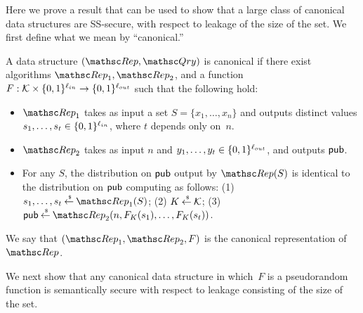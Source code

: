 
Here we prove a result that can be used to show that a large class of canonical
data structures are SS-secure, with respect to leakage of the size of the set.
We first define what we mean by ``canonical.''


\begin{definition}
A data structure $(\Rep, \Qry)$ is {\sf canonical} if
there exist algorithms $\Rep_1, \Rep_2$, and a function
$F: {\cal K} \times \{0,1\}^{\ell_{in}} \rightarrow \{0,1\}^{\ell_{out}}$
such that the following hold:
\begin{itemize}
\item $\Rep_1$ takes as input a set $S=\{x_1,\ldots,x_n\}$ and outputs distinct values $s_1, \ldots, s_t \in \{0,1\}^{\ell_{in}}$,
where $t$ depends only on~$n$.
\item $\Rep_2$ takes as input $n$ and $y_1, \ldots, y_t \in \{0,1\}^{\ell_{out}}$, and outputs
${\sf pub}$.
\item For any $S$, the distribution on ${\sf pub}$ output by $\Rep(S)$ is identical to the distribution
on ${\sf pub}$ computing as follows:
(1) $s_1, \ldots, s_t \getsr \Rep_1(S)$;
(2) $K {\:\stackrel{{\scriptscriptstyle \hspace{0.2em}\$}} {\leftarrow}\:} {\cal K}$;
(3) $\pubaux \getsr \Rep_2(n, F_{K}(s_1), \ldots,F_{K}(s_t))$.
\end{itemize}
We say that $(\Rep_1, \Rep_2, F)$ is the {\sf canonical representation}
of~$\Rep$. \hfill\dqed 
\end{definition}
We next show that any canonical data structure in which~$F$ is a pseudorandom function is
semantically secure with respect to leakage consisting of the size of the set.

